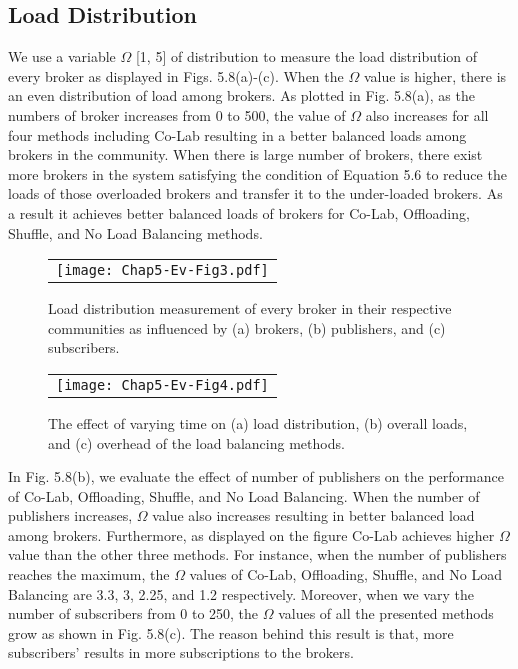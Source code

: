 \subsection{Load Distribution}\label{Chap5_05_03}
We use a variable $\Omega$ [1, 5] of distribution to measure the load distribution of every broker as displayed in Figs. 5.8(a)-(c). When the $\Omega$ value is higher, there is an even distribution of load among brokers.  As plotted in Fig. 5.8(a), as the numbers of broker increases from 0 to 500, the value of $\Omega$ also increases for all four methods including Co-Lab resulting in a better balanced loads among brokers in the community. When there is large number of brokers, there exist more brokers in the system satisfying the condition of Equation 5.6 to reduce the loads of those overloaded brokers and transfer it to the under-loaded brokers. As a result it achieves better balanced loads of brokers for Co-Lab, Offloading, Shuffle, and No Load Balancing methods.
\begin{figure}[t]
\begin{center}
  \begin{tabular}{c}
  \texttt{[image: Chap5-Ev-Fig3.pdf]}
  \end{tabular}
  \caption{Load distribution measurement of every broker in their respective communities as influenced by (a) brokers, (b) publishers, and (c) subscribers.}
\end{center}
\end{figure}
\begin{figure}[t]
\begin{center}
  \begin{tabular}{c}
  \texttt{[image: Chap5-Ev-Fig4.pdf]}
  \end{tabular}
  \caption{The effect of varying time on (a) load distribution, (b) overall loads, and (c) overhead of the load balancing methods.}
\end{center}
\end{figure}

In Fig. 5.8(b), we evaluate the effect of number of publishers on the performance of Co-Lab, Offloading, Shuffle, and No Load Balancing. When the number of publishers increases, $\Omega$ value also increases resulting in better balanced load among brokers. Furthermore, as displayed on the figure Co-Lab achieves higher $\Omega$ value than the other three methods. For instance, when the number of publishers reaches the maximum, the $\Omega$ values of Co-Lab, Offloading, Shuffle, and No Load Balancing are 3.3, 3, 2.25, and 1.2 respectively. Moreover, when we vary the number of subscribers from 0 to 250, the $\Omega$ values of all the presented methods grow as shown in Fig. 5.8(c). The reason behind this result is that, more subscribers' results in more subscriptions to the brokers.

